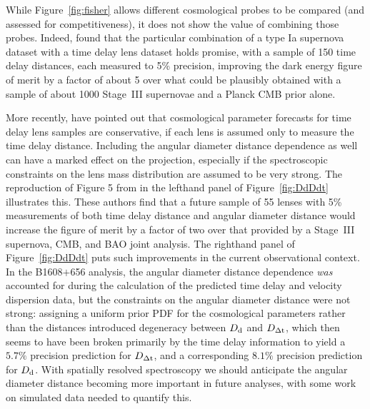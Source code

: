 While Figure~\ref{fig:fisher} allows different cosmological probes to
be compared (and assessed for competitiveness), it does not show the
value of combining those probes. Indeed, \citet{Lin11} found that the
particular combination of a type Ia supernova dataset with a time  delay
lens dataset holds promise, with a sample of 150 time delay distances,
each measured to 5\% precision, improving the dark energy figure of
merit by a factor of about 5 over what could be  plausibly obtained with
a sample of about 1000 Stage~III supernovae and a Planck CMB prior alone.

More recently, \citet{JeeKomatsuSuyu2015} have pointed out that
cosmological parameter forecasts for time delay lens samples are
conservative, if each lens is assumed only to measure the time delay
distance. Including the angular diameter distance dependence as well can
have a marked effect on the projection, especially if the spectroscopic
constraints on the lens mass distribution are assumed to be very strong.
The reproduction of Figure 5 from
\citet{JeeEtal2016} in the lefthand panel of Figure~\ref{fig:DdDdt}
illustrates this. These authors find that a future sample of
55 lenses
with 5\% measurements of both time delay distance and angular diameter
distance would increase the figure of merit by a factor of two over that
provided by a Stage~III supernova, CMB, and BAO joint analysis. The righthand
panel of Figure~\ref{fig:DdDdt} puts such improvements in the  current
observational context. In the B1608$+$656 analysis, the  angular
diameter distance dependence {\it was} accounted for during the
calculation of the predicted time delay and velocity dispersion data,
but the constraints on the angular diameter distance were not strong:
assigning a uniform prior PDF for the cosmological parameters rather
than the distances introduced degeneracy between $D_{\rm d}$ and $D_{\Delta{\rm t}}$,
which then seems to have been broken primarily by the time delay
information to yield a $5.7\%$ precision prediction for $D_{\Delta{\rm t}}$, and
a corresponding $8.1\%$ precision prediction for $D_{\rm d}$.
With spatially resolved spectroscopy we should anticipate the angular
diameter distance becoming more important in future analyses, with
some work on simulated data needed to quantify this.


